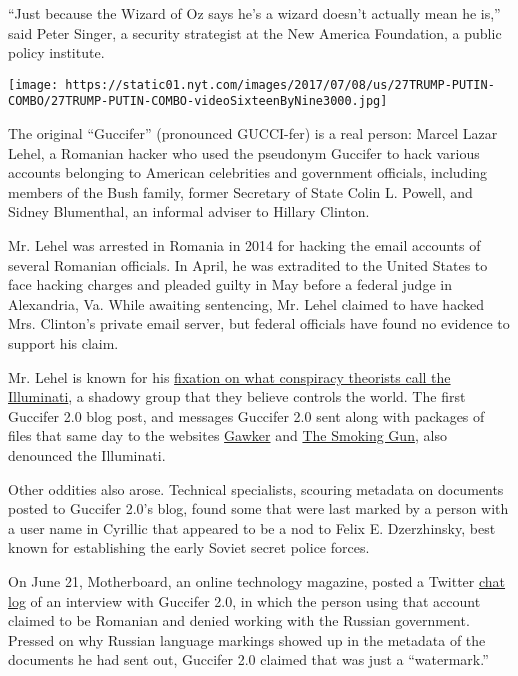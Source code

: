 ``Just because the Wizard of Oz says he's a wizard doesn't actually mean
he is,'' said Peter Singer, a security strategist at the New America
Foundation, a public policy institute.

\texttt{[image: https://static01.nyt.com/images/2017/07/08/us/27TRUMP-PUTIN-COMBO/27TRUMP-PUTIN-COMBO-videoSixteenByNine3000.jpg]}

The original ``Guccifer'' (pronounced GUCCI-fer) is a real person:
Marcel Lazar Lehel, a Romanian hacker who used the pseudonym Guccifer to
hack various accounts belonging to American celebrities and government
officials, including members of the Bush family, former Secretary of
State Colin L. Powell, and Sidney Blumenthal, an informal adviser to
Hillary Clinton.

Mr. Lehel was arrested in Romania in 2014 for hacking the email accounts
of several Romanian officials. In April, he was extradited to the United
States to face hacking charges and pleaded guilty in May before a
federal judge in Alexandria, Va. While awaiting sentencing, Mr. Lehel
claimed to have hacked Mrs. Clinton's private email server, but federal
officials have found no evidence to support his claim.

Mr. Lehel is known for his
\href{http://www.nytimes.com/2014/11/11/world/europe/for-guccifer-hacking-was-easy-prison-is-hard-.html}{fixation
on what conspiracy theorists call the Illuminati}, a shadowy group that
they believe controls the world. The first Guccifer 2.0 blog post, and
messages Guccifer 2.0 sent along with packages of files that same day to
the websites
\href{http://gawker.com/this-looks-like-the-dncs-hacked-trump-oppo-file-1782040426}{Gawker}
and
\href{http://www.thesmokinggun.com/documents/crime/dnc-hacker-leaks-trump-oppo-report-647293}{The
Smoking Gun}, also denounced the Illuminati.

Other oddities also arose. Technical specialists, scouring metadata on
documents posted to Guccifer 2.0's blog, found some that were last
marked by a person with a user name in Cyrillic that appeared to be a
nod to Felix E. Dzerzhinsky, best known for establishing the early
Soviet secret police forces.

On June 21, Motherboard, an online technology magazine, posted a Twitter
\href{https://motherboard.vice.com/read/dnc-hacker-guccifer-20-full-interview-transcript}{chat
log} of an interview with Guccifer 2.0, in which the person using that
account claimed to be Romanian and denied working with the Russian
government. Pressed on why Russian language markings showed up in the
metadata of the documents he had sent out, Guccifer 2.0 claimed that was
just a ``watermark.''

